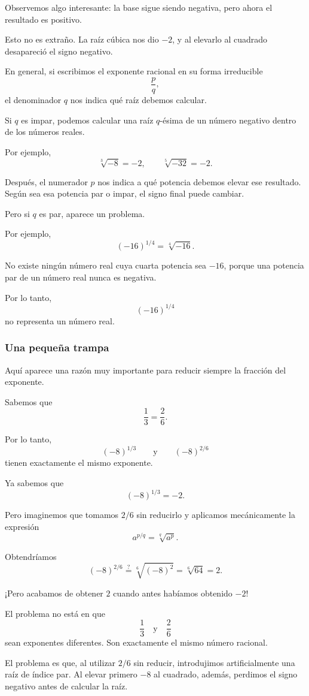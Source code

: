 Observemos algo interesante: la base sigue siendo negativa, pero ahora el resultado es positivo.

Esto no es extraño. La raíz cúbica nos dio \(-2\), y al elevarlo al cuadrado desapareció el signo negativo.

En general, si escribimos el exponente racional en su forma irreducible
\[
\frac pq,
\]
el denominador \(q\) nos indica qué raíz debemos calcular.

Si \(q\) es impar, podemos calcular una raíz \(q\)-ésima de un número negativo dentro de los números reales.

Por ejemplo,
\[
\sqrt[3]{-8}=-2,
\qquad
\sqrt[5]{-32}=-2.
\]

Después, el numerador \(p\) nos indica a qué potencia debemos elevar ese resultado. Según sea esa potencia par o impar, el signo final puede cambiar.

Pero si \(q\) es par, aparece un problema.

Por ejemplo,
\[
(-16)^{1/4}
=
\sqrt[4]{-16}.
\]

No existe ningún número real cuya cuarta potencia sea \(-16\), porque una potencia par de un número real nunca es negativa.

Por lo tanto,
\[
(-16)^{1/4}
\]
no representa un número real.

\subsubsection*{Una pequeña trampa}

Aquí aparece una razón muy importante para reducir siempre la fracción del exponente.

Sabemos que
\[
\frac13=\frac26.
\]

Por lo tanto,
\[
(-8)^{1/3}
\qquad\text{y}\qquad
(-8)^{2/6}
\]
tienen exactamente el mismo exponente.

Ya sabemos que
\[
(-8)^{1/3}=-2.
\]

Pero imaginemos que tomamos \(2/6\) sin reducirlo y aplicamos mecánicamente la expresión
\[
a^{p/q}=\sqrt[q]{a^p}.
\]

Obtendríamos
\[
(-8)^{2/6}
\stackrel{?}{=}
\sqrt[6]{(-8)^2}
=
\sqrt[6]{64}
=
2.
\]

¡Pero acabamos de obtener \(2\) cuando antes habíamos obtenido \(-2\)!

El problema no está en que
\[
\frac13
\quad\text{y}\quad
\frac26
\]
sean exponentes diferentes. Son exactamente el mismo número racional.

El problema es que, al utilizar \(2/6\) sin reducir, introdujimos artificialmente una raíz de índice par. Al elevar primero \(-8\) al cuadrado, además, perdimos el signo negativo antes de calcular la raíz.

